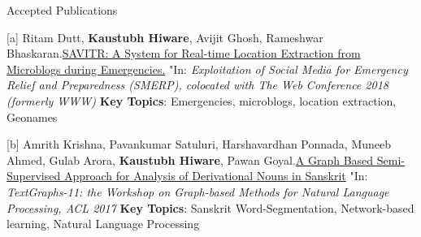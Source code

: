 \documentclass{resume} %
\begin{document}
\begin{rSection}{Accepted Publications}

[a] Ritam Dutt, \textbf{Kaustubh Hiware}, Avijit Ghosh, Rameshwar Bhaskaran.\href{https://www.cse.iitk.ac.in/users/kripa/smerp2018/savitr-system-real-ritam.pdf}{SAVITR: A System for Real-time Location Extraction from Microblogs during Emergencies.} "In: \textit{Exploitation of Social Media for Emergency Relief and Preparedness (SMERP), colocated with The Web Conference 2018 (formerly WWW)}
\textbf{\small Key Topics}: Emergencies, microblogs, location extraction, Geonames

[b] Amrith Krishna, Pavankumar Satuluri, Harshavardhan Ponnada, Muneeb Ahmed, Gulab Arora, \textbf{Kaustubh Hiware}, Pawan Goyal.\href{http://www.aclweb.org/anthology/W17-2409}{A Graph Based Semi-Supervised Approach for Analysis of Derivational Nouns in Sanskrit} "In: \textit{TextGraphs-11: the Workshop on Graph-based Methods for Natural Language Processing, ACL 2017}
\textbf{\small Key Topics}: Sanskrit Word-Segmentation, Network-based learning, Natural Language Processing

\end{rSection}

\end{document}
